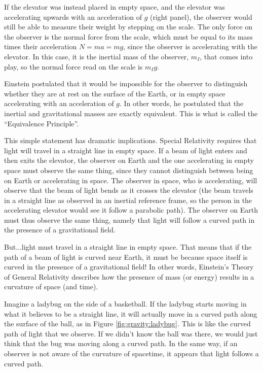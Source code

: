 If the elevator was instead placed in empty space, and the elevator was accelerating upwards with an acceleration of $g$ (right panel), the observer would still be able to measure their weight by stepping on the scale. The only force on the observer is the normal force from the scale, which must be equal to its mass times their acceleration $N=ma=mg$, since the observer is accelerating with the elevator. In this case, it is the inertial mass of the observer, $m_I$, that comes into play, so the normal force read on the scale is $m_Ig$.  


Einstein postulated that it would be impossible for the observer to distinguish whether they are at rest on the surface of the Earth, or in empty space accelerating with an acceleration of $g$. In other words, he postulated that the inertial and gravitational masses are exactly equivalent. This is what is called the ``Equivalence Principle''.

This simple statement has dramatic implications. Special Relativity requires that light will travel in a straight line in empty space. If a beam of light enters and then exits the elevator, the observer on Earth and the one accelerating in empty space must observe the same thing, since they cannot distinguish between being on Earth or accelerating in space. The observer in space, who is accelerating, will observe that the beam of light bends as it crosses the elevator (the beam travels in a straight line as observed in an inertial reference frame, so the person in the accelerating elevator would see it follow a parabolic path). The observer on Earth must thus observe the same thing, namely that light will follow a curved path in the presence of a gravitational field.

But...light must travel in a straight line in empty space. That means that if the path of a beam of light is curved near Earth, it must be because space itself is curved in the presence of a gravitational field! In other words, Einstein's Theory of General Relativity describes how the presence of mass (or energy) results in a curvature of space (and time).

Imagine a ladybug on the side of a basketball. If the ladybug starts moving in what it believes to be a straight line, it will actually move in a curved path along the surface of the ball, as in Figure \ref{fig:gravity:ladybug}. This is like the curved path of light that we observe. If we didn't know the ball was there, we would just think that the bug was moving along a curved path. In the same way, if an observer is not aware of the curvature of spacetime, it appears that light follows a curved path. 

